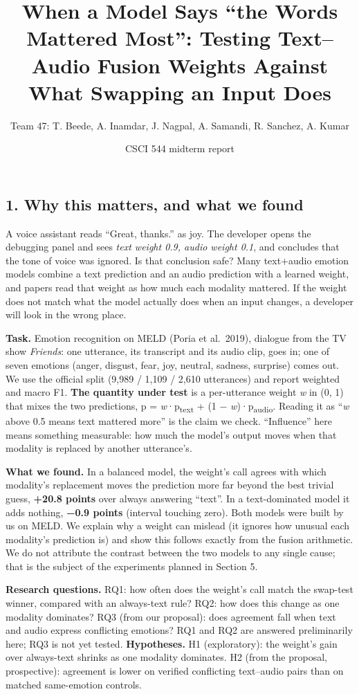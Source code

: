 \documentclass[
  10pt,
]{article}
\title{When a Model Says ``the Words Mattered Most'': Testing
Text--Audio Fusion Weights Against What Swapping an Input Does}
\author{Team 47: T. Beede, A. Inamdar, J. Nagpal, A. Samandi, R.
Sanchez, A. Kumar}
\date{CSCI 544 midterm report}
\begin{document}
\maketitle

\subsection{1. Why this matters, and what we
found}\label{why-this-matters-and-what-we-found}

A voice assistant reads ``Great, thanks.'' as joy. The developer opens
the debugging panel and sees \emph{text weight 0.9, audio weight 0.1},
and concludes that the tone of voice was ignored. Is that conclusion
safe? Many text+audio emotion models combine a text prediction and an
audio prediction with a learned weight, and papers read that weight as
how much each modality mattered. If the weight does not match what the
model actually does when an input changes, a developer will look in the
wrong place.

\textbf{Task.} Emotion recognition on MELD (Poria et al.~2019), dialogue
from the TV show \emph{Friends}: one utterance, its transcript and its
audio clip, goes in; one of seven emotions (anger, disgust, fear, joy,
neutral, sadness, surprise) comes out. We use the official split (9,989
/ 1,109 / 2,610 utterances) and report weighted and macro F1.
\textbf{The quantity under test} is a per-utterance weight \emph{w} in
(0, 1) that mixes the two predictions, p =
\emph{w}·p\textsubscript{text} + (1 − \emph{w})·p\textsubscript{audio}.
Reading it as ``\emph{w} above 0.5 means text mattered more'' is the
claim we check. ``Influence'' here means something measurable: how much
the model's output moves when that modality is replaced by another
utterance's.

\textbf{What we found.} In a balanced model, the weight's call agrees
with which modality's replacement moves the prediction more far beyond
the best trivial guess, \textbf{+20.8 points} over always answering
``text''. In a text-dominated model it adds nothing, \textbf{−0.9
points} (interval touching zero). Both models were built by us on MELD.
We explain why a weight can mislead (it ignores how unusual each
modality's prediction is) and show this follows exactly from the fusion
arithmetic. We do not attribute the contrast between the two models to
any single cause; that is the subject of the experiments planned in
Section 5.

\textbf{Research questions.} RQ1: how often does the weight's call match
the swap-test winner, compared with an always-text rule? RQ2: how does
this change as one modality dominates? RQ3 (from our proposal): does
agreement fall when text and audio express conflicting emotions? RQ1 and
RQ2 are answered preliminarily here; RQ3 is not yet tested.
\textbf{Hypotheses.} H1 (exploratory): the weight's gain over
always-text shrinks as one modality dominates. H2 (from the proposal,
prospective): agreement is lower on verified conflicting text--audio
pairs than on matched same-emotion controls.
\end{document}
